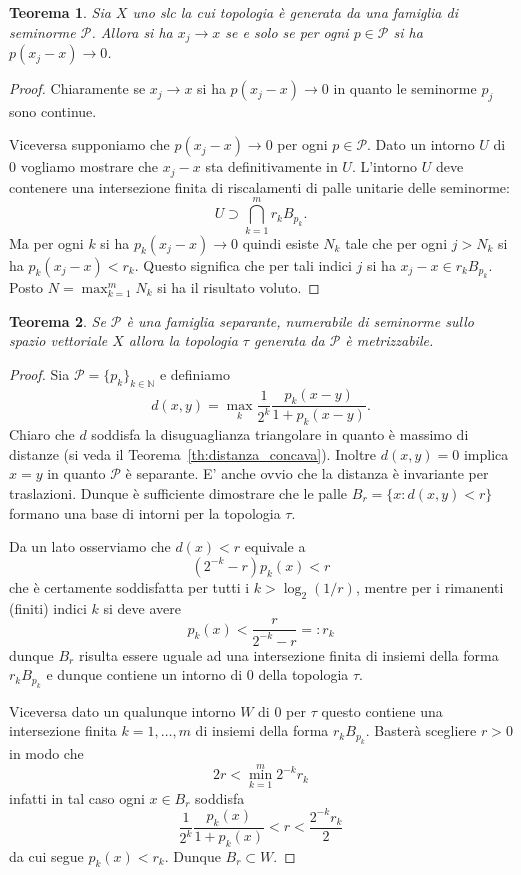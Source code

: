 \documentclass[italian,a4paper,oneside,headinclude]{scrbook}
\renewcommand{\P}{\mathcal P}
\newcommand{\NN}{\mathbb N}
\newtheorem{theorem}{Teorema}
\begin{document}
\begin{theorem}\label{th:slc_conv}
  Sia $X$ uno slc la cui topologia è generata da una famiglia di
  seminorme $\P$.
  Allora si ha $x_j\to x$ se e solo se per ogni
  $p\in \P$ si ha $p(x_j-x)\to 0$.
\end{theorem}
%
\begin{proof}
  Chiaramente se $x_j \to x$ si ha $p(x_j-x)\to 0$ in quanto le
  seminorme $p_j$ sono continue.

  Viceversa supponiamo che $p(x_j-x)\to 0$ per ogni
  $p\in \P$. Dato un intorno $U$ di $0$ vogliamo mostrare che $x_j-x$
  sta definitivamente in $U$.
  L'intorno $U$ deve contenere una intersezione finita di riscalamenti
  di palle unitarie delle seminorme:
  \[
  U \supset \bigcap_{k=1}^m r_k B_{p_k}.
  \]
  Ma per ogni $k$ si ha $p_k(x_j-x)\to 0$ quindi esiste $N_k$ tale che
  per ogni $j>N_k$ si ha $p_k(x_j-x) < r_k$. Questo significa che per
  tali indici $j$ si ha $x_j-x \in r_k B_{p_k}$. Posto $N=\max_{k=1}^m
  N_k$ si ha il risultato voluto.
\end{proof}

\begin{theorem}\label{th:slc_metrizzabile}
  Se $\P$ è una famiglia separante, numerabile di seminorme sullo spazio
  vettoriale $X$ allora la topologia $\tau$ generata da $\P$
  è metrizzabile.
\end{theorem}
%
\begin{proof}
  Sia $\P=\{p_k\}_{k\in\NN}$ e definiamo
  \[
  d(x,y) = \max_k \frac{1}{2^k}\frac{p_k(x-y)}{1+p_k(x-y)}.
  \]
  Chiaro che $d$ soddisfa la disuguaglianza triangolare in quanto è
  massimo
  di distanze (si
  veda il Teorema~\ref{th:distanza_concava}). Inoltre $d(x,y)=0$
  implica $x=y$ in quanto $\P$ è separante.
  E' anche ovvio che la distanza è invariante per traslazioni. Dunque
  è sufficiente dimostrare che le palle $B_r = \{x\colon d(x,y)<r\}$
  formano una base di intorni per la topologia $\tau$.

  Da un lato osserviamo che $d(x)<r$ equivale a
  \[
  (2^{-k}-r) p_k(x) < r
  \]
  che è certamente soddisfatta per tutti i $k>\log_2(1/r)$,
  mentre per i rimanenti (finiti) indici $k$ si deve avere
  \[
  p_k(x) < \frac{r}{2^{-k}-r} =: r_k
  \]
  dunque $B_r$ risulta essere uguale ad una intersezione finita di
  insiemi della forma $r_k B_{p_k}$ e dunque contiene un intorno di
  $0$ della topologia $\tau$.

  Viceversa dato un qualunque intorno $W$ di $0$ per $\tau$ questo
  contiene una intersezione finita $k=1,\dots,m$ di insiemi della forma
  $r_k  B_{p_k}$.
  Basterà scegliere $r>0$ in modo che
  \[
  2r < \min_{k=1}^m 2^{-k} r_k
  \]
  infatti in tal caso ogni $x\in B_r$ soddisfa
  \[
  \frac{1}{2^k} \frac{p_k(x)}{1+p_k(x)} < r < \frac{2^{-k}r_k}{2}
  \]
  da cui segue $p_k(x) < r_k$. Dunque $B_r\subset W$.
\end{proof}
\end{document}
